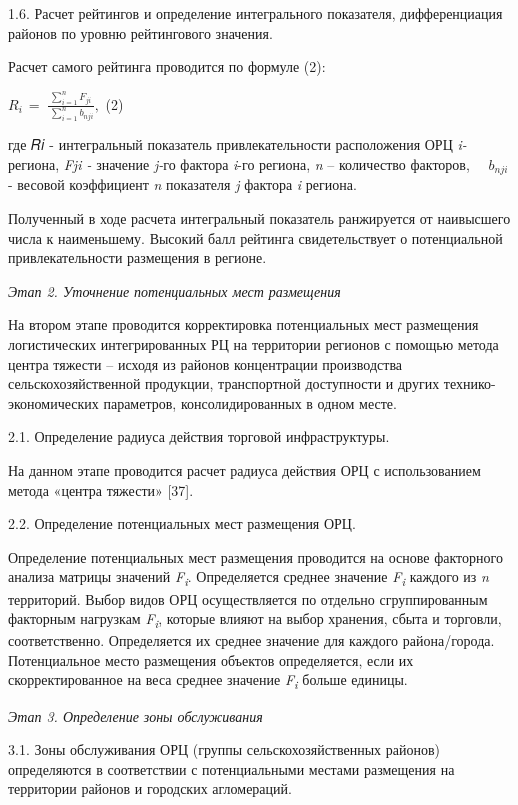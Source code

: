 1.6. Расчет рейтингов и определение интегрального показателя,
дифференциация районов по уровню рейтингового значения.

Расчет самого рейтинга проводится по формуле (2):

\(R_{i\ } = \ \frac{\sum_{i = 1}^{n}F_{ji}}{\ \sum_{i = 1}^{n}b_{nji}},\)
(2)

где 𝑅𝑖 - интегральный показатель привлекательности расположения ОРЦ
\emph{i-} региона, \emph{Fji -} значение \emph{j-}го фактора \emph{i}-го
региона, \emph{n} -- количество факторов,\({\ \ \ \ \ \ b}_{nji\ }\)-
весовой коэффициент \emph{n} показателя \emph{j} фактора \emph{i}
региона.

Полученный в ходе расчета интегральный показатель ранжируется от
наивысшего числа к наименьшему. Высокий балл рейтинга свидетельствует о
потенциальной привлекательности размещения в регионе.

\emph{Этап 2. Уточнение потенциальных мест размещения}

На втором этапе проводится корректировка потенциальных мест размещения
логистических интегрированных РЦ на территории регионов с помощью метода
центра тяжести -- исходя из районов концентрации производства
сельскохозяйственной продукции, транспортной доступности и других
технико-экономических параметров, консолидированных в одном месте.

2.1. Определение радиуса действия торговой инфраструктуры.

На данном этапе проводится расчет радиуса действия ОРЦ с использованием
метода «центра тяжести» {[}37{]}.

2.2. Определение потенциальных мест размещения ОРЦ.

Определение потенциальных мест размещения проводится на основе
факторного анализа матрицы значений \emph{F\textsubscript{i}}.
Определяется среднее значение \emph{F\textsubscript{i}} каждого из
\emph{n} территорий. Выбор видов ОРЦ осуществляется по отдельно
сгруппированным факторным нагрузкам \emph{F\textsubscript{i}}, которые
влияют на выбор хранения, сбыта и торговли, соответственно. Определяется
их среднее значение для каждого района/города. Потенциальное место
размещения объектов определяется, если их скорректированное на веса
среднее значение \emph{F\textsubscript{i}} больше единицы.

\emph{Этап 3. Определение зоны обслуживания}

3.1. Зоны обслуживания ОРЦ (группы сельскохозяйственных районов)
определяются в соответствии с потенциальными местами размещения на
территории районов и городских агломераций.

